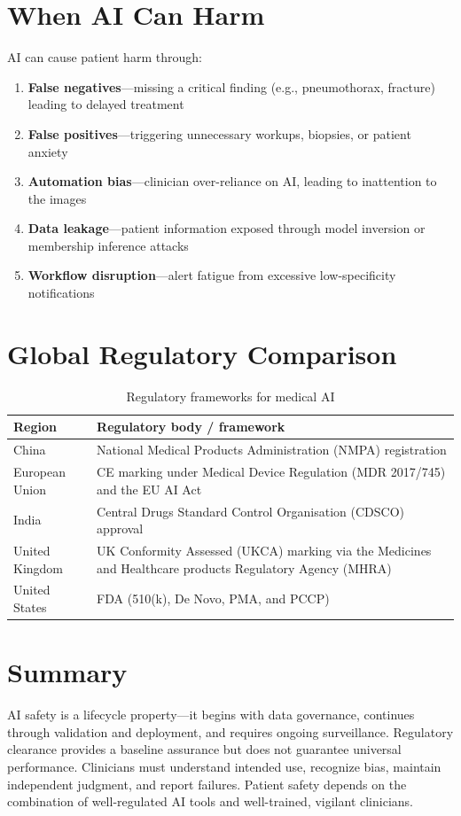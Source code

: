 \section{When AI Can Harm}
AI can cause patient harm through:
\begin{enumerate}
    \item \textbf{False negatives}---missing a critical finding (e.g., pneumothorax, fracture) leading to delayed treatment
    \item \textbf{False positives}---triggering unnecessary workups, biopsies, or patient anxiety
    \item \textbf{Automation bias}---clinician over-reliance on AI, leading to inattention to the images
    \item \textbf{Data leakage}---patient information exposed through model inversion or membership inference attacks
    \item \textbf{Workflow disruption}---alert fatigue from excessive low-specificity notifications
\end{enumerate}

\section{Global Regulatory Comparison}
\begin{table}[ht]
\centering
\caption{Regulatory frameworks for medical AI}
\label{tab:ai_global_regulation}
\begin{tabular}{@{}p{}p{}@{}}
\toprule
\textbf{Region} & \textbf{Regulatory body / framework} \\
\midrule
China & National Medical Products Administration (NMPA) registration \\
European Union & CE marking under Medical Device Regulation (MDR 2017/745) and the EU AI Act \\
India & Central Drugs Standard Control Organisation (CDSCO) approval \\
United Kingdom & UK Conformity Assessed (UKCA) marking via the Medicines and Healthcare products Regulatory Agency (MHRA) \\
United States & FDA (510(k), De Novo, PMA, and PCCP) \\
\bottomrule
\end{tabular}
\end{table}

\section{Summary}
AI safety is a lifecycle property---it begins with data governance, continues through validation and deployment, and requires ongoing surveillance. Regulatory clearance provides a baseline assurance but does not guarantee universal performance. Clinicians must understand intended use, recognize bias, maintain independent judgment, and report failures. Patient safety depends on the combination of well-regulated AI tools and well-trained, vigilant clinicians.

\clearpage
